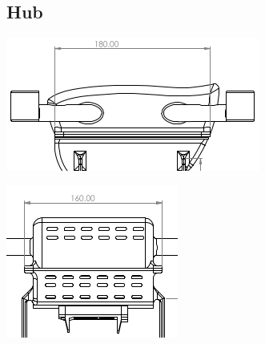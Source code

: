 \documentclass[12pt]{report}
\begin{document}
      \subsection*{Hub}
      \noindent
      \begin{minipage}{0.48\textwidth}
          \centering
          \includegraphics[width=\linewidth]{hub1.png}
      \end{minipage}%
      \hfill
      \begin{minipage}{0.48\textwidth}
          \centering
          \includegraphics[width=0.7\linewidth]{hub3.png}
      \end{minipage}

      \vspace{1em}  %
\end{document}
